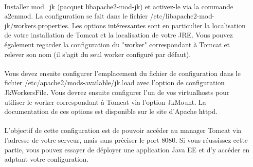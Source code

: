 \documentclass[12pt,a4paper]{article}
\begin{document}
\paragraph{}
Installer mod\_jk (pacquet libapache2-mod-jk) et activez-le via la commande a2enmod. La configuration se fait dans le fichier /etc/libapache2-mod-jk/workers.properties. Les options intéressantes sont en particulier la localisation de votre installation de Tomcat et la localisation de votre JRE. Vous pouvez également regarder la configuration du "worker" correspondant à Tomcat et relever son nom (il s'agit du seul worker configuré par défaut).

\paragraph{}
Vous devez ensuite configurer l'emplacement du fichier de configuration dans le fichier /etc/apache2/mods-available/jk.load avec l'option de configuration JkWorkersFile. Vous devrez ensuite configurer l'un de vos virtualhosts pour utiliser le worker correspondant à Tomcat via l'option JkMount. La documentation de ces options est disponible sur le site d'Apache httpd.

\paragraph{}
L'objectif de cette configuration est de pouvoir accéder au manager Tomcat via l'adresse de votre serveur, mais sans préciser le port 8080. Si vous réussissez cette partie, vous pouvez essayer de déployer une application Java EE et d'y accéder en adptant votre configuration.
\end{document}

